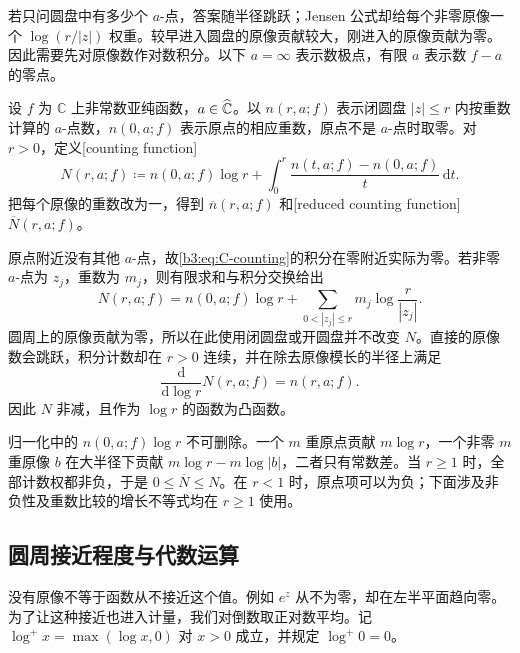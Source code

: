 若只问圆盘中有多少个 \(a\)-点，答案随半径跳跃；Jensen 公式却给每个非零原像一个 \(\log(r/|z|)\) 权重。较早进入圆盘的原像贡献较大，刚进入的原像贡献为零。因此需要先对原像数作对数积分。以下 \(a=\infty\) 表示数极点，有限 \(a\) 表示数 \(f-a\) 的零点。

\begin{definition}[计数函数与约化计数]\label{b3:def:C-counting}
设 \(f\) 为 \(\mathbb C\) 上非常数亚纯函数，\(a\in\widehat{\mathbb C\kern0pt}\)。以 \(n(r,a;f)\) 表示闭圆盘 \(|z|\le r\) 内按重数计算的 \(a\)-点数，\(n(0,a;f)\) 表示原点的相应重数，原点不是 \(a\)-点时取零。对 \(r>0\)，定义[counting function]
\begin{equation}\label{b3:eq:C-counting}
 N(r,a;f)\coloneqq n(0,a;f)\log r+
 \int_0^r\frac{n(t,a;f)-n(0,a;f)}t\,\mathrm{d}t.
\end{equation}
把每个原像的重数改为一，得到 \(\overline n(r,a;f)\) 和[reduced counting function] \(\overline N(r,a;f)\)。
\end{definition}

原点附近没有其他 \(a\)-点，故\eqref{b3:eq:C-counting}的积分在零附近实际为零。若非零 \(a\)-点为 \(z_j\)，重数为 \(m_j\)，则有限求和与积分交换给出
\[
 N(r,a;f)=n(0,a;f)\log r+
 \sum_{0<|z_j|\le r}m_j\log\frac r{|z_j|}.
\]
圆周上的原像贡献为零，所以在此使用闭圆盘或开圆盘并不改变 \(N\)。直接的原像数会跳跃，积分计数却在 \(r>0\) 连续，并在除去原像模长的半径上满足
\[
 \frac{\mathrm d}{\mathrm d\log r}N(r,a;f)=n(r,a;f).
\]
因此 \(N\) 非减，且作为 \(\log r\) 的函数为凸函数。

\ProseParagraphBreak

归一化中的 \(n(0,a;f)\log r\) 不可删除。一个 \(m\) 重原点贡献 \(m\log r\)，一个非零 \(m\) 重原像 \(b\) 在大半径下贡献 \(m\log r-m\log|b|\)，二者只有常数差。当 \(r\ge1\) 时，全部计数权都非负，于是 \(0\le\overline N\le N\)。在 \(r<1\) 时，原点项可以为负；下面涉及非负性及重数比较的增长不等式均在 \(r\ge1\) 使用。

\subsection{圆周接近程度与代数运算}
\label{b3:subsec:C0102}

没有原像不等于函数从不接近这个值。例如 \(e^z\) 从不为零，却在左半平面趋向零。为了让这种接近也进入计量，我们对倒数取正对数平均。记
\(\log^+x=\max(\log x,0)\) 对 \(x>0\) 成立，并规定 \(\log^+0=0\)。

